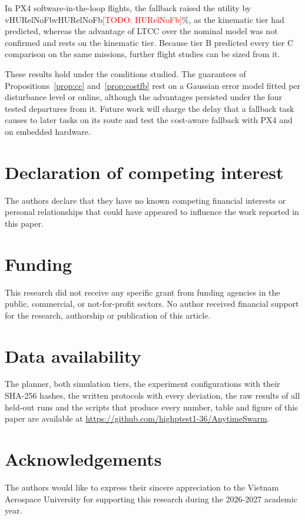 \documentclass[a4paper,fleqn]{cas-dc}
\newcommand{\todo}[1]{\textcolor{red}{[TODO: #1]}}
\newcommand{\mname}{LTCC}  %
\newcommand{\val}[1]{\ifcsname v#1\endcsname\csname v#1\endcsname\else\todo{#1}\fi}
\newcounter{prop}
\begin{document}
In PX4 software-in-the-loop flights, the fallback raised the utility by \val{HURelNoFb}\%, as the kinematic tier had
predicted, whereas the advantage of \mname{} over the nominal model was not confirmed and rests on the kinematic tier.
Because tier B predicted every tier C comparison on the same missions, further flight studies can be sized from it.

These results hold under the conditions studied. The guarantees of Propositions~\ref{prop:cc} and~\ref{prop:costfb}
rest on a Gaussian error model fitted per disturbance level or online, although the advantages persisted under the four
tested departures from it. Future work will charge the delay that a fallback task causes to later tasks on its route
and test the cost-aware fallback with PX4 and on embedded hardware.

\printcredits

\section*{Declaration of competing interest}
The authors declare that they have no known competing financial interests or personal relationships that could have
appeared to influence the work reported in this paper.

\section*{Funding}
This research did not receive any specific grant from funding agencies in the public, commercial, or not-for-profit
sectors. No author received financial support for the research, authorship or publication of this article.

\section*{Data availability}
The planner, both simulation tiers, the experiment configurations with their SHA-256 hashes, the written protocols with
every deviation, the raw results of all held-out runs and the scripts that produce every number, table and figure of
this paper are available at \url{https://github.com/highptest1-36/AnytimeSwarm}.


\section*{Acknowledgements}
The authors would like to express their sincere appreciation to the Vietnam Aerospace University for supporting this
research during the 2026-2027 academic year.
\end{document}
